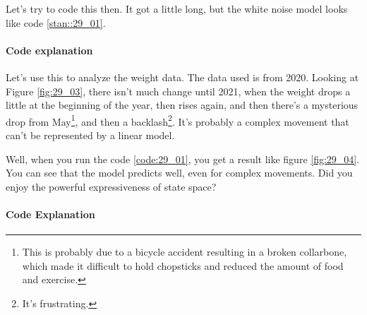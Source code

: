 \documentclass{ltjsbook}
\begin{document}
Let's try to code this then. It got a little long, but the white noise model looks like code \ref{stan::29_01}.

\paragraph{Code explanation}


Let's use this to analyze the weight data. The data used is from 2020. Looking at Figure \ref{fig:29_03}, there isn't much change until 2021, when the weight drops a little at the beginning of the year, then rises again, and then there's a mysterious drop from May\footnote{This is probably due to a bicycle accident resulting in a broken collarbone, which made it difficult to hold chopsticks and reduced the amount of food and exercise.}, and then a backlash\footnote{It's frustrating.}. It's probably a complex movement that can't be represented by a linear model.




Well, when you run the code \ref{code:29_01}, you get a result like figure \ref{fig:29_04}. You can see that the model predicts well, even for complex movements. Did you enjoy the powerful expressiveness of state space?

\paragraph{Code Explanation}

\end{document}
